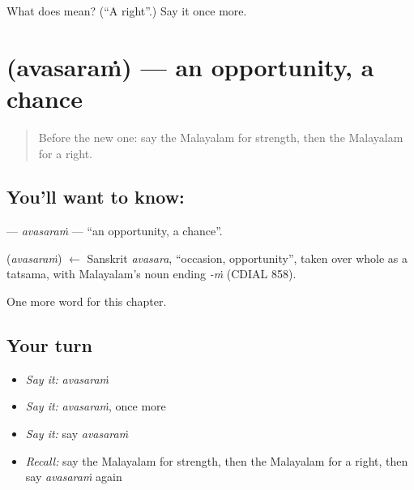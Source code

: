 \begin{tcolorbox}[breakable,colback=teal!4,colframe=teal!35!black,title={Before you move on}]
What does  mean? (\textquotedblleft{}A right\textquotedblright{}.) Say it once more.
\end{tcolorbox}
\section[\texorpdfstring{\ml{അവസരം} (avasaraṁ)}{അവസരം (avasaraṁ)}]{ (avasaraṁ) — an opportunity, a chance}

\label{lesson:ML-C142-avasaram}



\begin{quote}
Before the new one: say the Malayalam for strength, then the Malayalam for a right.
\end{quote}

\subsection*{You'll want to know: }
\textbf{} — \emph{avasaraṁ} — \textquotedblleft{}an opportunity, a chance\textquotedblright{}.

\begin{cousinweb}
\textbf{} (\emph{avasaraṁ}) $\leftarrow$ Sanskrit \emph{avasara}, \textquotedblleft{}occasion, opportunity\textquotedblright{}, taken over whole as a tatsama, with Malayalam's noun ending \emph{-ṁ} (CDIAL 858).
\end{cousinweb}

\begin{grammarlens}[title={What you've built}]
One more word for this chapter.
\end{grammarlens}

\subsection*{Your turn}
\begin{itemize}
\raggedright
  \item \emph{Say it:} \emph{avasaraṁ}
  \item \emph{Say it:} \emph{avasaraṁ}, once more
  \item \emph{Say it:} say \emph{avasaraṁ}
  \item \emph{Recall:} say the Malayalam for strength, then the Malayalam for a right, then say \emph{avasaraṁ} again
\end{itemize}

